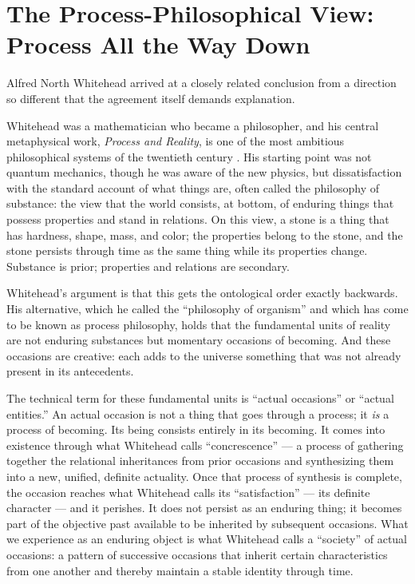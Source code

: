 \section{The Process-Philosophical View: Process All the Way Down}
\label{sec:ch12-process}

Alfred North Whitehead arrived at a closely related conclusion from a direction so different that the agreement itself demands explanation.

Whitehead was a mathematician who became a philosopher, and his central metaphysical work, \textit{Process and Reality}, is one of the most ambitious philosophical systems of the twentieth century \citep{Whitehead1929}. His starting point was not quantum mechanics, though he was aware of the new physics, but dissatisfaction with the standard account of what things are, often called the philosophy of substance: the view that the world consists, at bottom, of enduring things that possess properties and stand in relations. On this view, a stone is a thing that has hardness, shape, mass, and color; the properties belong to the stone, and the stone persists through time as the same thing while its properties change. Substance is prior; properties and relations are secondary.

Whitehead's argument is that this gets the ontological order exactly backwards. His alternative, which he called the ``philosophy of organism'' and which has come to be known as process philosophy, holds that the fundamental units of reality are not enduring substances but momentary occasions of becoming. And these occasions are creative: each adds to the universe something that was not already present in its antecedents.

The technical term for these fundamental units is ``actual occasions'' or ``actual entities.'' An actual occasion is not a thing that goes through a process; it \emph{is} a process of becoming. Its being consists entirely in its becoming. It comes into existence through what Whitehead calls ``concrescence'' — a process of gathering together the relational inheritances from prior occasions and synthesizing them into a new, unified, definite actuality. Once that process of synthesis is complete, the occasion reaches what Whitehead calls its ``satisfaction'' — its definite character — and it perishes. It does not persist as an enduring thing; it becomes part of the objective past available to be inherited by subsequent occasions. What we experience as an enduring object is what Whitehead calls a ``society'' of actual occasions: a pattern of successive occasions that inherit certain characteristics from one another and thereby maintain a stable identity through time.

